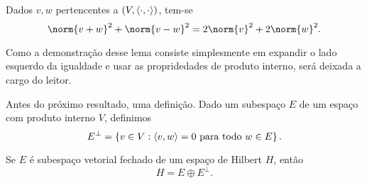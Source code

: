 \begin{lem}
    Dados \( v, w \) pertencentes a \( (V, \langle\cdot,\cdot\rangle) \), tem-se \[
        \norm{ v + w }^2 + \norm{ v - w }^2 = 2 \norm{ v }^2 + 2 \norm{ w }^2
    .\]
\end{lem}

Como a demonstração desse lema consiste simplesmente em expandir o lado esquerdo da igualdade e usar as propridedades de produto interno, será deixada a cargo do leitor.

Antes do próximo resultado, uma definição.
Dado um subespaço \( E \) de um espaço com produto interno \( V \), definimos \[
    E^{ \perp } = \left\{ v \in V : \langle v,w\rangle = 0 \text{ para todo } w \in E \right\}
.\]

\begin{teo}
    Se \( E \) é subespaço vetorial fechado de um espaço de Hilbert \( H \), então \[
        H = E \oplus E^{ \perp }
    .\]
    \label{teo: proj_ort}
\end{teo}
